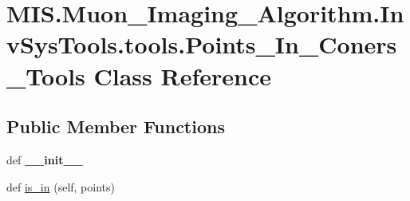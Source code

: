 \hypertarget{classMIS_1_1Muon__Imaging__Algorithm_1_1InvSysTools_1_1tools_1_1Points__In__Coners__Tools}{}\section{M\+I\+S.\+Muon\+\_\+\+Imaging\+\_\+\+Algorithm.\+Inv\+Sys\+Tools.\+tools.\+Points\+\_\+\+In\+\_\+\+Coners\+\_\+\+Tools Class Reference}
\label{classMIS_1_1Muon__Imaging__Algorithm_1_1InvSysTools_1_1tools_1_1Points__In__Coners__Tools}
\subsection*{Public Member Functions}
\begin{DoxyCompactItemize}
\item 
\mbox{\label{classMIS_1_1Muon__Imaging__Algorithm_1_1InvSysTools_1_1tools_1_1Points__In__Coners__Tools_af08f39934a27979cad5cbee902c818ef}} 
def {\bfseries \+\_\+\+\_\+init\+\_\+\+\_\+}
\item 
def \hyperlink{classMIS_1_1Muon__Imaging__Algorithm_1_1InvSysTools_1_1tools_1_1Points__In__Coners__Tools_a710d276a36153d37edd506bc24943afa}{is\+\_\+in} (self, points)
\end{DoxyCompactItemize}

